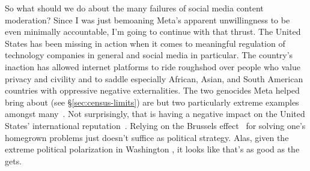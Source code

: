 So what should we do about the many failures of social media content moderation?
Since I was just bemoaning Meta's apparent unwillingness to be even minimally
accountable, I'm going to continue with that thrust. The United States has been
missing in action when it comes to meaningful regulation of technology companies
in general and social media in particular. The country's inaction has allowed
internet platforms to ride roughshod over people who value privacy and civility
and to saddle especially African, Asian, and South American countries with
oppressive negative externalities. The two genocides Meta helped bring about
(see \S\ref{sec:census-limits}) are but two particularly extreme examples
amongst
many~\cite{DwoskinNewmyerea2021,ElliottChristopherea2021a,FrenkelAlba2021,Iyengar2021,MacSilverman2020,Morris2021,Newton2021,Satariano2021,Scott2021,SilvermanMacea2020,Simonite2021,WongEllisPetersen2021,WongErnst2021,WongHarding2021,ZahrzewskiDeVynckea2021}.
Not surprisingly, that is having a negative impact on the United States'
international reputation~\cite{GeltzerGhosh2018}. Relying on the Brussels
effect~\cite{Bradford2020} for solving one's homegrown problems just doesn't
suffice as political strategy. Alas, given the extreme political polarization in
Washington , it looks like that's as good as the  gets.

